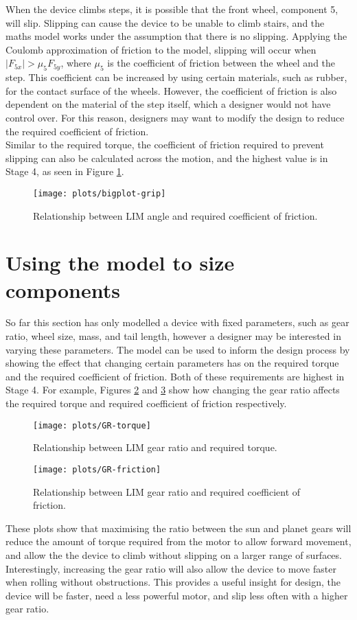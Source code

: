 When the device climbs steps, it is possible that the front wheel, component 5, will slip. Slipping can cause the device to be unable to climb stairs, and the maths model works under the assumption that there is no slipping. Applying the Coulomb approximation of friction to the model, slipping will occur when $|F_{5x}| > \mu_5 F_{5y}$, where $\mu_5$ is the coefficient of friction between the wheel and the step. This coefficient can be increased by using certain materials, such as rubber, for the contact surface of the wheels. However, the coefficient of friction is also dependent on the material of the step itself, which a designer would not have control over. For this reason, designers may want to modify the design to reduce the required coefficient of friction.\\
Similar to the required torque, the coefficient of friction required to prevent slipping can also be calculated across the motion, and the highest value is in Stage 4, as seen in Figure \ref{bigplot-grip}.

\begin{figure}[h]
	\centering
	\texttt{[image: plots/bigplot-grip]}
	\caption{Relationship between LIM angle and required coefficient of friction.}
	\label{bigplot-grip}
\end{figure}

\section{Using the model to size components}
So far this section has only modelled a device with fixed parameters, such as gear ratio, wheel size, mass, and tail length, however a designer may be interested in varying these parameters. The model can be used to inform the design process by showing the effect that changing certain parameters has on the required torque and the required coefficient of friction. Both of these requirements are highest in Stage 4. For example, Figures \ref{fig:GR-torque} and \ref{fig:GR-friction} show how changing the gear ratio affects the required torque and required coefficient of friction respectively.\\

\begin{figure}[h]
	\centering
	\texttt{[image: plots/GR-torque]}
	\caption{Relationship between LIM gear ratio and required torque.}
	\label{fig:GR-torque}
\end{figure}
\begin{figure}[h]
	\centering
	\texttt{[image: plots/GR-friction]}
	\caption{Relationship between LIM gear ratio and required coefficient of friction.}
	\label{fig:GR-friction}
\end{figure}
These plots show that maximising the ratio between the sun and planet gears will reduce the amount of torque required from the motor to allow forward movement, and allow the the device to climb without slipping on a larger range of surfaces. Interestingly, increasing the gear ratio will also allow the device to move faster when rolling without obstructions. This provides a useful insight for design, the device will be faster, need a less powerful motor, and slip less often with a higher gear ratio.
